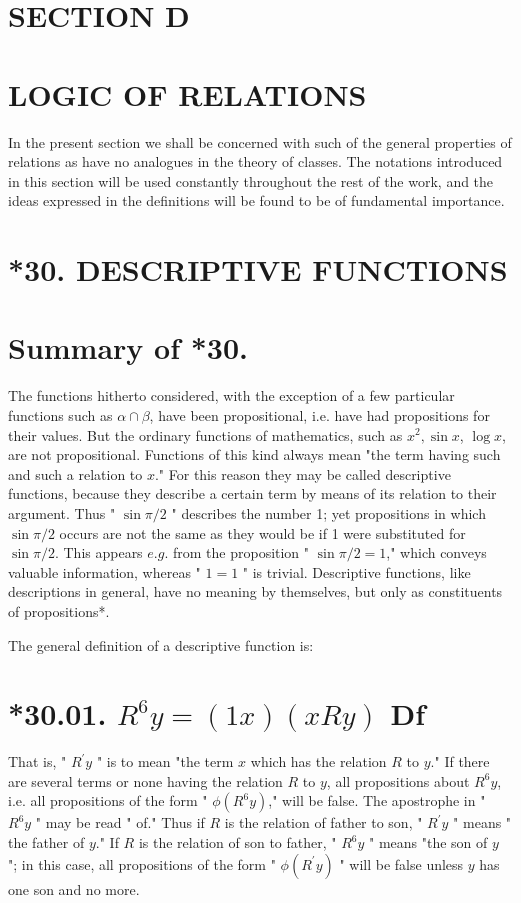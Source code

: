 \documentclass[10pt]{article}
\begin{document}
\section*{SECTION D}
\section*{LOGIC OF RELATIONS}
In the present section we shall be concerned with such of the general properties of relations as have no analogues in the theory of classes. The notations introduced in this section will be used constantly throughout the rest of the work, and the ideas expressed in the definitions will be found to be of fundamental importance.

\section*{*30. DESCRIPTIVE FUNCTIONS}
\section*{Summary of *30.}
The functions hitherto considered, with the exception of a few particular functions such as $\alpha \cap \beta$, have been propositional, i.e. have had propositions for their values. But the ordinary functions of mathematics, such as $x^{2}, \sin x$, $\log x$, are not propositional. Functions of this kind always mean "the term having such and such a relation to $x$." For this reason they may be called descriptive functions, because they describe a certain term by means of its relation to their argument. Thus " $\sin \pi / 2$ " describes the number 1; yet propositions in which $\sin \pi / 2$ occurs are not the same as they would be if 1 were substituted for $\sin \pi / 2$. This appears $e . g$. from the proposition " $\sin \pi / 2=1$," which conveys valuable information, whereas " $1=1$ " is trivial. Descriptive functions, like descriptions in general, have no meaning by themselves, but only as constituents of propositions*.

The general definition of a descriptive function is:

\section*{*30.01. $R^{6} y=(1 x)(x R y)$ Df}
That is, " $R^{\prime} y$ " is to mean "the term $x$ which has the relation $R$ to $y$." If there are several terms or none having the relation $R$ to $y$, all propositions about $R^{6} y$, i.e. all propositions of the form " $\phi\left(R^{6} y\right)$," will be false. The apostrophe in " $R^{6} y$ " may be read " of." Thus if $R$ is the relation of father to son, " $R^{\prime} y$ " means " the father of $y$." If $R$ is the relation of son to father, " $R^{6} y$ " means "the son of $y$ "; in this case, all propositions of the form " $\phi\left(R^{\prime} y\right)$ " will be false unless $y$ has one son and no more.
\end{document}
